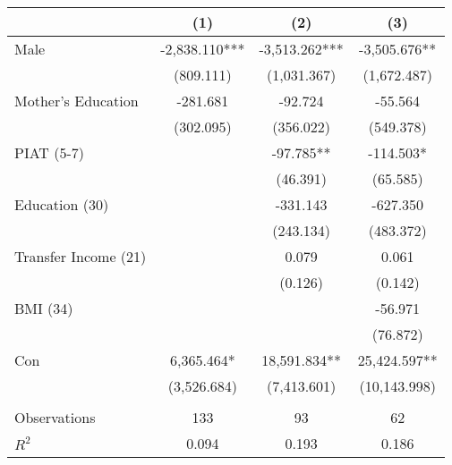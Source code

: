 \begin{tabular}{lccc} \toprule
 & (1) & (2) & (3) \\ \midrule
Male & -2,838.110*** & -3,513.262*** & -3,505.676** \\
 & (809.111) & (1,031.367) & (1,672.487) \\
Mother's Education  & -281.681 & -92.724 & -55.564 \\
 & (302.095) & (356.022) & (549.378) \\
PIAT (5-7) &  & -97.785** & -114.503* \\
 &  & (46.391) & (65.585) \\
Education (30) &  & -331.143 & -627.350 \\
 &  & (243.134) & (483.372) \\
Transfer Income (21) &  & 0.079 & 0.061 \\
 &  & (0.126) & (0.142) \\
BMI (34) &  &  & -56.971 \\
 &  &  & (76.872) \\
Con & 6,365.464* & 18,591.834** & 25,424.597** \\
 & (3,526.684) & (7,413.601) & (10,143.998) \\ \\ \midrule
Observations & 133 & 93 & 62 \\
$R^2$ & 0.094 & 0.193 & 0.186 \\ \bottomrule
\end{tabular}
